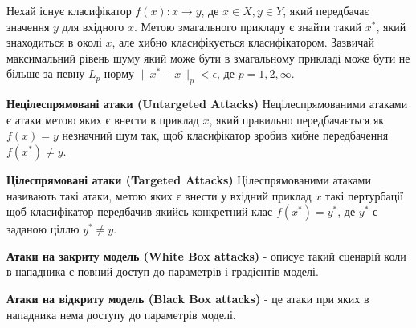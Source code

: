 \documentclass[a4paper,14pt]{extreport}
\begin{document}
	Нехай існує класифікатор $f(x):x\rightarrow y$, де  $x \in X, y \in Y$, який передбачає значення $y$ для вхідного $x$. Метою змагального прикладу є знайти такий $x^{*}$, який знаходиться в околі $x$, але хибно класифікується класифікатором. Зазвичай максимальний рівень шуму який може бути в змагальному прикладі може бути не більше за певну $L_p$ норму $ \| x^{*} - x \|_p < \epsilon $, де $p=1,2,\infty $.
	\newline \par
	\textbf{Нецілеспрямовані атаки (Untargeted Attacks)} \newline Нецілеспрямованими атаками є атаки метою яких є внести в приклад $x$, який правильно передбачається як $f(x) = y$ незначний шум так, щоб класифікатор зробив хибне передбачення $f(x^{*}) \neq y$.
	\newline \par
	\textbf{Цілеспрямовані атаки (Targeted Attacks)} \newline
	Цілеспрямованими атаками називають такі атаки, метою яких є внести у вхідний приклад $x$ такі пертурбації щоб класифікатор передбачив якийсь конкретний клас $f(x^{*}) = y^{*}$, де $y^{*}$ є заданою ціллю $y^{*} \neq y$.
	\newline \par
	\textbf{Атаки на закриту модель (White Box attacks)} - описує такий сценарій коли в нападника є повний доступ до параметрів і градієнтів моделі.  
	\newline \par
	\textbf{Атаки на відкриту модель (Black Box attacks)} - це атаки при яких в нападника нема доступу до параметрів моделі. 


	
	
\end{document}
